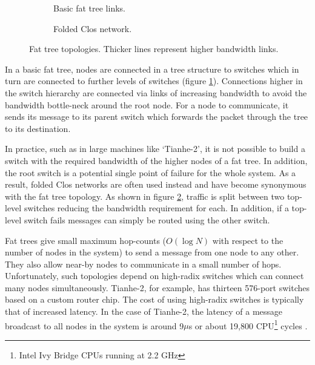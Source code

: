 				\begin{figure}
					\begin{subfigure}[t]{\textwidth}
						\center
						
						\caption{Basic fat tree links.}
						\label{fig:fat-tree-concept}
					\end{subfigure}
					
					\vspace{1.5em}
					
					\begin{subfigure}[t]{\textwidth}
						\center
						
						\caption{Folded Clos network.}
						\label{fig:fat-tree-closs}
					\end{subfigure}
					
					\caption[Fat tree topologies.]{Fat tree topologies. Thicker lines
					represent higher bandwidth links.}
					\label{fig:fat-tree}
				\end{figure}
			
				In a basic fat tree, nodes are connected in a tree structure to switches
				which in turn are connected to further levels of switches (figure
				\ref{fig:fat-tree-concept}). Connections higher in the switch hierarchy
				are connected via links of increasing bandwidth to avoid the bandwidth
				bottle-neck around the root node. For a node to communicate, it
				sends its message to its parent switch which forwards the packet through
				the tree to its destination.
				
				In practice, such as in large machines like `Tianhe-2', it is not
				possible to build a switch with the required bandwidth of the higher
				nodes of a fat tree. In addition, the root switch is a potential single
				point of failure for the whole system. As a result, folded Clos networks
				are often used instead and have become synonymous with the fat tree
				topology. As shown in figure \ref{fig:fat-tree-closs}, traffic is split
				between two top-level switches reducing the bandwidth requirement for
				each. In addition, if a top-level switch fails messages can simply be
				routed using the other switch.
				
				Fat trees give small maximum hop-counts ($O(\log{N})$ with respect to
				the number of nodes in the system) to send a message from one node to
				any other. They also allow near-by nodes to communicate in a small
				number of hops. Unfortunately, such topologies depend on high-radix
				switches which can connect many nodes simultaneously.  Tianhe-2, for
				example, has thirteen 576-port switches based on a custom router chip.
				The cost of using high-radix switches is typically that of increased
				latency. In the case of Tianhe-2, the latency of a message broadcast to
				all nodes in the system is around 9$\mu$s or about 19,800
				CPU\footnote{Intel Ivy Bridge CPUs running at 2.2 GHz} cycles
				\cite{dongarra13}.
				
